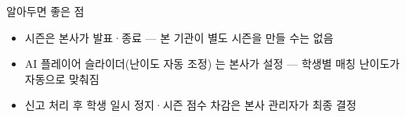 \begin{tipbox}{알아두면 좋은 점}
\begin{itemize}[leftmargin=1.2em]
  \item 시즌은 본사가 발표·종료 — 본 기관이 별도 시즌을 만들 수는 없음
  \item AI 플레이어 슬라이더(난이도 자동 조정) 는 본사가 설정 — 학생별 매칭 난이도가 자동으로 맞춰짐
  \item 신고 처리 후 학생 일시 정지·시즌 점수 차감은 본사 관리자가 최종 결정
\end{itemize}
\end{tipbox}
